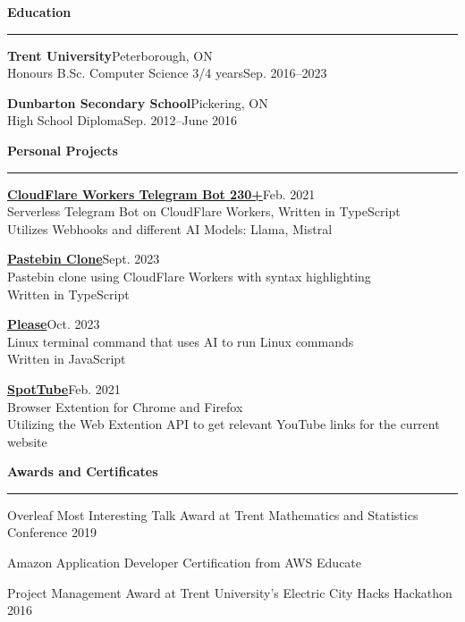 \documentclass[letterpaper,11pt]{article}
\newcommand{\mysection}[1]{\vspace{5pt} {\bfseries #1} \\ {\color{gray} \rule[5pt]{\textwidth}{1pt}}}
\begin{document}
\mysection{Education}
\begin{description}
    \item \textbf{Trent University}\hfill Peterborough, ON\\
        Honours B.Sc. Computer Science 3/4 years\hfill Sep. 2016–2023
    \item \textbf{Dunbarton Secondary School}\hfill Pickering, ON\\
        High School Diploma\hfill Sep. 2012–June 2016
\end{description}

\mysection{Personal Projects}
\begin{description}
    \item
         \href{https://github.com/codebam/cf-workers-telegram-bot}{\textbf{CloudFlare Workers Telegram Bot  230+}}\hfill Feb. 2021\\
        Serverless Telegram Bot on CloudFlare Workers, Written in TypeScript\\
        Utilizes Webhooks and different AI Models: Llama, Mistral\\
    \item {} \href{https://github.com/codebam/pastebin-r2}{\textbf{Pastebin Clone}}\hfill Sept. 2023\\
        Pastebin clone using CloudFlare Workers with syntax highlighting\\
        Written in TypeScript\\
    \item {} \href{https://github.com/codebam/please}{\textbf{Please}}\hfill Oct. 2023\\
        Linux terminal command that uses AI to run Linux commands\\
        Written in JavaScript\\
    \item {} \href{https://github.com/codebam/spottube}{\textbf{SpotTube}}\hfill Feb. 2021\\
        Browser Extention for Chrome and Firefox\\
        Utilizing the Web Extention API to get relevant YouTube links for the current website\\
\end{description}

\mysection{Awards and Certificates}
\begin{description}
    \item {} Overleaf Most Interesting Talk Award at Trent Mathematics and Statistics Conference 2019
    \item {} Amazon Application Developer Certification from AWS Educate
    \item {} Project Management Award at Trent University's Electric City Hacks Hackathon 2016
\end{description}
\end{document}
